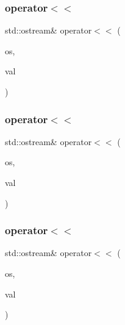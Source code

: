\subsubsection{\texorpdfstring{operator$<$$<$}{operator<<}\hspace{0.1cm}{\footnotesize\ttfamily [1/9]}}
{\footnotesize\ttfamily std\+::ostream\& operator$<$$<$ (\begin{DoxyParamCaption}\item[{std\+::ostream \&}]{os,  }\item[{const \mbox{\hyperlink{structfakeit_1_1FakeitException}{Fakeit\+Exception}} \&}]{val }\end{DoxyParamCaption})\hspace{0.3cm}{\ttfamily [friend]}}

\mbox{\label{structfakeit_1_1FakeitException_a8321660a372d94f410baf5fee0302fd7}} 
\subsubsection{\texorpdfstring{operator$<$$<$}{operator<<}\hspace{0.1cm}{\footnotesize\ttfamily [2/9]}}
{\footnotesize\ttfamily std\+::ostream\& operator$<$$<$ (\begin{DoxyParamCaption}\item[{std\+::ostream \&}]{os,  }\item[{const \mbox{\hyperlink{structfakeit_1_1FakeitException}{Fakeit\+Exception}} \&}]{val }\end{DoxyParamCaption})\hspace{0.3cm}{\ttfamily [friend]}}

\mbox{\label{structfakeit_1_1FakeitException_a8321660a372d94f410baf5fee0302fd7}} 
\subsubsection{\texorpdfstring{operator$<$$<$}{operator<<}\hspace{0.1cm}{\footnotesize\ttfamily [3/9]}}
{\footnotesize\ttfamily std\+::ostream\& operator$<$$<$ (\begin{DoxyParamCaption}\item[{std\+::ostream \&}]{os,  }\item[{const \mbox{\hyperlink{structfakeit_1_1FakeitException}{Fakeit\+Exception}} \&}]{val }\end{DoxyParamCaption})\hspace{0.3cm}{\ttfamily [friend]}}


